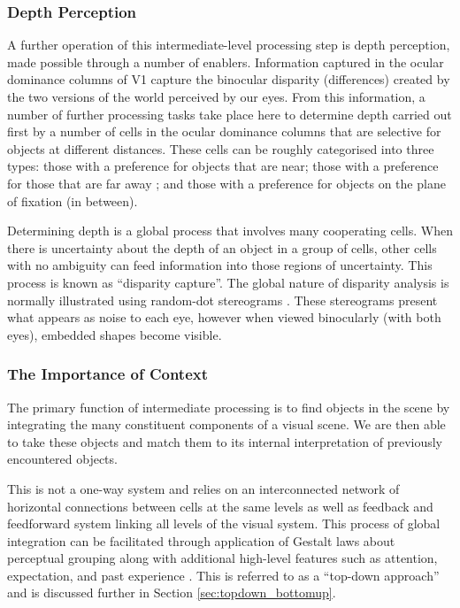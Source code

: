 \subsubsection{Depth Perception}
A further operation of this intermediate-level processing step is depth perception, made possible through a number of enablers. 
Information captured in the ocular dominance columns of V1 capture the binocular disparity (differences) created by the two versions of the world perceived by our eyes. 
From this information, a number of further processing tasks take place here to determine depth carried out first by a number of cells in the ocular dominance columns that are selective for objects at different distances.
These cells can be roughly categorised into three types: those with a preference for objects that are near; those with a preference for those that are far away \cite{kandel2012principles}; and those with a preference for objects on the plane of fixation (in between).

Determining depth is a global process that involves many cooperating cells. 
When there is uncertainty about the depth of an object in a group of cells, other cells with no ambiguity can feed information into those regions of uncertainty. 
This process is known as ``disparity capture''.
The global nature of disparity analysis is normally illustrated using random-dot stereograms \cite{julesz1971foundations}. 
These stereograms present what appears as noise to each eye, however when viewed binocularly (with both eyes), embedded shapes become visible\cite{kandel2012principles}.

\subsubsection{The Importance of Context}
The primary function of intermediate processing is to find objects in the scene by integrating the many constituent components of a visual scene. 
We are then able to take these objects and match them to its internal interpretation of previously encountered objects\cite{kandel2012principles}. 

This is not a one-way system and relies on an interconnected network of horizontal connections between cells at the same levels as well as feedback and feedforward system linking all levels of the visual system. 
This process of global integration can be facilitated through application of Gestalt laws about perceptual grouping along with additional high-level features such as attention, expectation, and past experience \cite{kandel2012principles}. 
This is referred to as a ``top-down approach'' and is discussed further in Section \ref{sec:topdown_bottomup}. 

